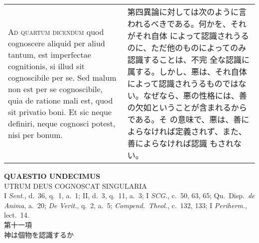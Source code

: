 \documentclass[10pt]{jsarticle} %
\begin{document}
\begin{longtable}{p{21em}p{21em}}
\\


{\scshape Ad quartum dicendum} quod cognoscere aliquid per aliud
tantum, est imperfectae cognitionis, si illud sit cognoscibile per
se. Sed malum non est per se cognoscibile, quia de ratione mali est,
quod sit privatio boni. Et sic neque definiri, neque cognosci potest,
nisi per bonum.

&

第四異論に対しては次のように言われるべきである。何かを、それがそれ自体
によって認識されうるのに、ただ他のものによってのみ認識することは、不完
全な認識に属する。しかし、悪は、それ自体によって認識されうるものではな
い。なぜなら、悪の性格には、善の欠如ということが含まれるからである。そ
の意味で、悪は、善によらなければ定義されず、また、善によらなければ認識
もされない。


\end{longtable}
\newpage




\begin{center}
{\Large {\bf QUAESTIO UNDECIMUS}}\\ {\large UTRUM DEUS COGNOSCAT
SINGULARIA}\\ {\footnotesize I {\itshape Sent.}, d.~36, q.~1, a.~1;
II, d.~3, q.~11, a.~3; I {\itshape SCG.}, c.~50, 63, 65;
Qu.~Disp.~{\itshape de Anima}, a.~20; {\itshape De Verit.}, q.~2,
a.~5; {\itshape Compend.~Theol.}, c.~132, 133; I {\itshape Periherm.},
lect.~14.}\\ {\Large 第十一項\\神は個物を認識するか}
\end{center}
\end{document}
